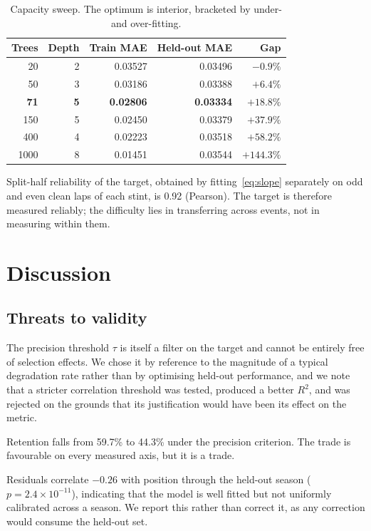 \documentclass[conference]{IEEEtran}
\begin{document}
\begin{table}[t]
\caption{Capacity sweep. The optimum is interior, bracketed by under- and
over-fitting.}
\label{tab:capacity}
\centering
\begin{tabular}{rrrrr}
\toprule
Trees & Depth & Train MAE & Held-out MAE & Gap \\
\midrule
20   & 2 & 0.03527 & 0.03496 & $-0.9\%$ \\
50   & 3 & 0.03186 & 0.03388 & $+6.4\%$ \\
\textbf{71} & \textbf{5} & \textbf{0.02806} & \textbf{0.03334} & $+18.8\%$ \\
150  & 5 & 0.02450 & 0.03379 & $+37.9\%$ \\
400  & 4 & 0.02223 & 0.03518 & $+58.2\%$ \\
1000 & 8 & 0.01451 & 0.03544 & $+144.3\%$ \\
\bottomrule
\end{tabular}
\end{table}

Split-half reliability of the target, obtained by fitting~\eqref{eq:slope}
separately on odd and even clean laps of each stint, is 0.92 (Pearson). The
target is therefore measured reliably; the difficulty lies in transferring
across events, not in measuring within them.

\section{Discussion}

\subsection{Threats to validity}

The precision threshold $\tau$ is itself a filter on the target and cannot be
entirely free of selection effects. We chose it by reference to the magnitude
of a typical degradation rate rather than by optimising held-out performance,
and we note that a stricter correlation threshold was tested, produced a better
$R^2$, and was rejected on the grounds that its justification would have been
its effect on the metric.

Retention falls from 59.7\% to 44.3\% under the precision criterion. The trade
is favourable on every measured axis, but it is a trade.

Residuals correlate $-0.26$ with position through the held-out season
($p = 2.4\times10^{-11}$), indicating that the model is well fitted but not
uniformly calibrated across a season. We report this rather than correct it,
as any correction would consume the held-out set.
\end{document}
